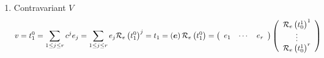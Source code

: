\documentclass[aps,preprint]{revtex4}
\begin{document}
\begin{enumerate}
\item Contravariant $V$ \label{Contravariant V} 
\begin{equation}
v=t_{1}^{0}=\sum_{1\leq j\leq r}c^{j}e_{j}=\sum_{1\leq j\leq r}e_{j}\mathcal{%
R}_{e}\left( t_{1}^{0}\right) ^{j}=t_{1}=\left( \boldsymbol{e}\right) 
\mathcal{R}_{e}\left( t_{1}^{0}\right) =\left( 
\begin{array}{ccc}
e_{1} & \cdots & e_{r}%
\end{array}%
\right) \left( 
\begin{array}{c}
\mathcal{R}_{e}\left( t_{0}^{1}\right) ^{1} \\ 
\vdots \\ 
\mathcal{R}_{e}\left( t_{0}^{1}\right) ^{r}%
\end{array}%
\right)
\end{equation}


\end{enumerate}
\end{document}
